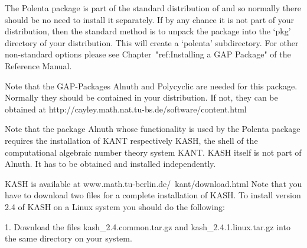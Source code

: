 
\null

The Polenta package is part of the standard distribution of {\GAP} and
so normally there should be no need to install it separately.
If by any chance it is not part of your {\GAP} distribution, then 
the standard method is to unpack	 the package into the `pkg'
directory  of your {\GAP} distribution.  This will create a `polenta'
subdirectory. 
For other non-standard options please see  Chapter~"ref:Installing a
GAP Package" of the {\GAP} Reference Manual.

Note that the GAP-Packages Alnuth and Polycyclic are needed for this package.
Normally they should be contained in your distribution. If not, 
they can be obtained at
\begintt
             http://cayley.math.nat.tu-bs.de/software/content.html
\endtt



                    
Note that the {\GAP} package Alnuth whose functionality is used by the Polenta
package requires the installation of KANT respectively
KASH, the shell
of the computational algebraic number theory system KANT.  KASH itself
is not part of Alnuth.  It has to be obtained and installed
independently.
                                                            
KASH is available at
\begintt
               www.math.tu-berlin.de/~kant/download.html
\endtt
Note that you have to download two files for a complete installation
of KASH.  To install version 2.4 of KASH on a Linux
system you should do the following:
\beginlist
\item{1.} Download the files
    kash_2.4.common.tar.gz and kash_2.4.1.linux.tar.gz
    into the same directory on your system.
                                                                               
